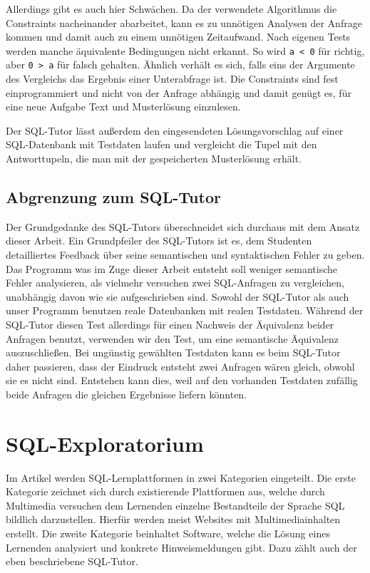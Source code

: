 Allerdings gibt es auch hier Schwächen. Da der verwendete Algorithmus die Constraints nacheinander abarbeitet, kann es zu unnötigen Analysen der Anfrage kommen und damit auch zu einem unnötigen Zeitaufwand. Nach eigenen Tests werden manche äquivalente Bedingungen nicht erkannt. So wird \verb|a < 0| für richtig, aber \verb|0 > a| für falsch gehalten. Ähnlich verhält es sich, falls eins der Argumente des Vergleichs das Ergebnis einer Unterabfrage ist. Die Constraints sind fest einprogrammiert und nicht von der Anfrage abhängig und damit genügt es, für eine neue Aufgabe Text und Musterlösung einzulesen. 

Der SQL-Tutor lässt außerdem den eingesendeten Lösungsvorschlag auf einer SQL-Datenbank mit Testdaten laufen und vergleicht die Tupel mit den Antworttupeln, die man mit der gespeicherten Musterlösung erhält.

\subsection*{Abgrenzung zum SQL-Tutor}

Der Grundgedanke des SQL-Tutors überschneidet sich durchaus mit dem Ansatz dieser Arbeit. Ein Grundpfeiler des SQL-Tutors ist es, dem Studenten detailliertes Feedback über seine semantischen und syntaktischen Fehler zu geben. Das Programm was im Zuge dieser Arbeit entsteht soll weniger semantische Fehler analysieren, als vielmehr versuchen zwei SQL-Anfragen zu vergleichen, unabhängig davon wie sie aufgeschrieben sind. Sowohl der SQL-Tutor als auch unser Programm benutzen reale Datenbanken mit realen Testdaten. Während der SQL-Tutor diesen Test allerdings für einen Nachweis der Äquivalenz beider Anfragen benutzt, verwenden wir den Test, um eine semantische Äquivalenz auszuschließen. Bei ungünstig gewählten Testdaten kann es beim SQL-Tutor daher passieren, dass der Eindruck entsteht zwei Anfragen wären gleich, obwohl sie es nicht sind. Entstehen kann dies, weil auf den vorhanden Testdaten zufällig beide Anfragen die gleichen Ergebnisse liefern könnten.

\section{SQL-Exploratorium}

Im Artikel \cite{explora1} werden SQL-Lernplattformen in zwei Kategorien eingeteilt. Die erste Kategorie zeichnet sich durch existierende Plattformen aus, welche durch Multimedia versuchen dem Lernenden einzelne Bestandteile der Sprache SQL bildlich darzustellen. Hierfür werden meist Websites mit Multimediainhalten erstellt. Die zweite Kategorie beinhaltet Software, welche die Lösung eines Lernenden analysiert und konkrete Hinweismeldungen gibt. Dazu zählt auch der eben beschriebene SQL-Tutor.

